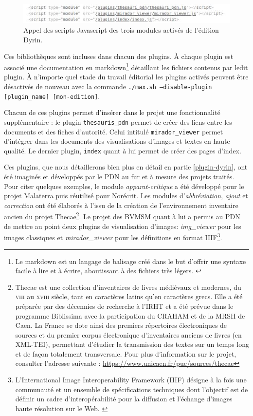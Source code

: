 \documentclass[a4paper,12pt,twoside]{book}
\begin{document}
\begin{figure}[H]
    \centering
    \includegraphics[width=13cm]{img/partie_2/modules_html.JPG}
    \caption{Appel des scripts Javascript des trois modules activés de l'édition Dyrin.}
\end{figure}

Ces bibliothèques sont incluses dans chacun des plugins.
À chaque plugin est associé une documentation en markdown\footnote{Le markdown est un langage de balisage créé dans le but d'offrir une syntaxe facile à lire et à écrire, aboutissant à des fichiers très légers. \cite{markdown}} détaillant les fichiers contenus par ledit plugin.
À n'importe quel stade du travail éditorial les plugins activés peuvent être désactivés de nouveau avec la commande \texttt{./max.sh --disable-plugin [plugin\_name] [mon-edition]}.

Chacun de ces plugins permet d'insérer dans le projet une fonctionnalité supplémentaire : le plugin \texttt{thesauris\_pdn} permet de créer des liens entre les documents et des fiches d'autorité. Celui intitulé \texttt{mirador\_viewer} permet d'intégrer dans les documents des visualisations d'images et textes en haute qualité. Le dernier plugin, \texttt{index} quant à lui permet de créer des pages d'index.

Ces plugins, que nous détaillerons bien plus en détail en partie \ref{plugin-dyrin}, ont été imaginés et développés par le \acrshort{PDN} au fur et à mesure des projets traités. Pour citer quelques exemples, le module \textit{apparat-critique} a été développé pour le projet Malaterra puis réutilisé pour Norécrit. Les modules d'\textit{abbréviation}, \textit{ajout} et \textit{correction} ont été élaborés à l'issu de la création de l'environnement inventaire ancien du projet Thecae\footnote{Thecae est une collection d'inventaires de livres médiévaux et modernes, du \textsc{viii}\ieme{} au \textsc{xviii}\ieme{} siècle, tant en caractères latins qu'en caractères grecs. Elle a été préparée par des décennies de recherche à l'IRHT et a été prévue dans le programme Biblissima avec la participation du \acrshort{CRAHAM} et de la \acrshort{MRSH} de Caen. La France se dote ainsi des premiers répertoires électroniques de sources et du premier corpus électronique d'inventaires anciens de livres (en XML-TEI), permettant d'étudier la transmission des textes sur un temps long et de façon totalement transversale. Pour plus d'information sur le projet, consulter l'adresse suivante : \url{https://www.unicaen.fr/puc/sources/thecae}\label{thecae}}. Le projet des \acrshort{BVMSM} quant à lui a permis au \acrshort{PDN} de mettre au point deux plugins de visualisation d'images: \textit{img\_viewer} pour les images classiques et \textit{mirador\_viewer} pour les définitions en format \acrshort{IIIF}\footnote{L'International Image Interoperability Framework (IIIF) désigne à la fois une communauté et un ensemble de spécifications techniques dont l'objectif est de définir un cadre d'interopérabilité pour la diffusion et l'échange d'images haute résolution sur le Web. \cite{iiif-intro}}.
\end{document}
